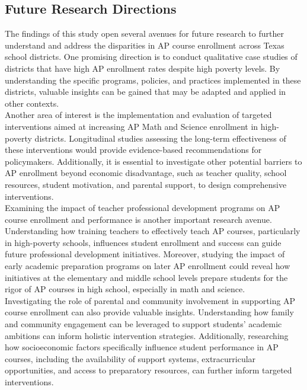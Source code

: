 \documentclass[sn-mathphys-num]{sn-jnl}%
\theoremstyle{thmstyleone}%
\theoremstyle{thmstyletwo}%
\theoremstyle{thmstylethree}%
\begin{document}
{\subsection{Future Research Directions}

The findings of this study open several avenues for future research to further understand and address the disparities in AP course enrollment across Texas school districts. One promising direction is to conduct qualitative case studies of districts that have high AP enrollment rates despite high poverty levels. By understanding the specific programs, policies, and practices implemented in these districts, valuable insights can be gained that may be adapted and applied in other contexts.\\

Another area of interest is the implementation and evaluation of targeted interventions aimed at increasing AP Math and Science enrollment in high-poverty districts. Longitudinal studies assessing the long-term effectiveness of these interventions would provide evidence-based recommendations for policymakers. Additionally, it is essential to investigate other potential barriers to AP enrollment beyond economic disadvantage, such as teacher quality, school resources, student motivation, and parental support, to design comprehensive interventions.\\

Examining the impact of teacher professional development programs on AP course enrollment and performance is another important research avenue. Understanding how training teachers to effectively teach AP courses, particularly in high-poverty schools, influences student enrollment and success can guide future professional development initiatives. Moreover, studying the impact of early academic preparation programs on later AP enrollment could reveal how initiatives at the elementary and middle school levels prepare students for the rigor of AP courses in high school, especially in math and science.\\

Investigating the role of parental and community involvement in supporting AP course enrollment can also provide valuable insights. Understanding how family and community engagement can be leveraged to support students' academic ambitions can inform holistic intervention strategies. Additionally, researching how socioeconomic factors specifically influence student performance in AP courses, including the availability of support systems, extracurricular opportunities, and access to preparatory resources, can further inform targeted interventions.\\

}
\end{document}
